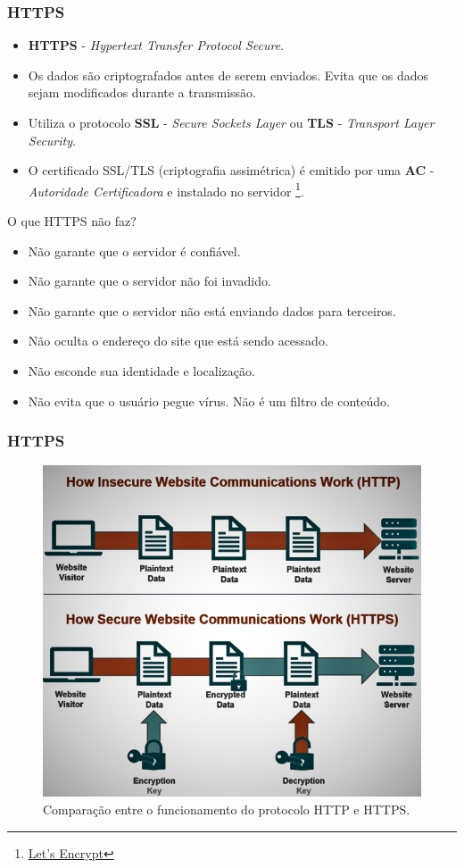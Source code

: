 \documentclass[
	10pt, %
	t, %
]{beamer}
\newcommand{\iconLink}[2]{\href{#1}{\faLink \hspace{0.2em} {#2}}}
\begin{document}
\begin{frame}
	\frametitle{HTTPS}

	\begin{itemize}
		\item \textbf{HTTPS} - \textit{Hypertext Transfer Protocol \alert{Secure}}.
		\item Os dados são criptografados antes de serem enviados. Evita que os dados sejam modificados durante a transmissão.
		\item Utiliza o protocolo \textbf{SSL} - \textit{Secure Sockets Layer} ou \textbf{TLS} - \textit{Transport Layer Security}.
		\item O certificado SSL/TLS (criptografia assimétrica) é emitido por uma \textbf{AC} - \textit{Autoridade Certificadora} e instalado no servidor \footnote{\iconLink{https://letsencrypt.org/}{Let's Encrypt}}.
	\end{itemize}
	
	\begin{block}{O que HTTPS não faz?}
		\begin{itemize}
			\item Não garante que o servidor é confiável.
			\item Não garante que o servidor não foi invadido.
			\item Não garante que o servidor não está enviando dados para terceiros.
			\item Não oculta o endereço do site que está sendo acessado.
			\item Não esconde sua identidade e localização.
			\item Não evita que o usuário pegue vírus. Não é um filtro de conteúdo.
		\end{itemize}
		
	\end{block}
	
\end{frame}

\begin{frame}
	\frametitle{HTTPS}

	\begin{figure}
		\centering
		\includegraphics[width=0.65\linewidth]{http_https.png}
		\caption{Comparação entre o funcionamento do protocolo HTTP e HTTPS.}
		\label{fig:https}
	\end{figure}

\end{frame}
\end{document}
